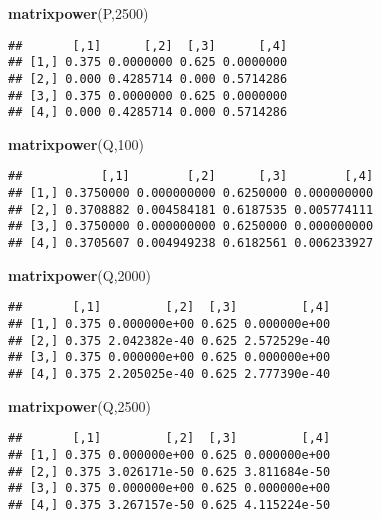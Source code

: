\documentclass[
]{article}
\newenvironment{Shaded}{\begin{snugshade}}{\end{snugshade}}
\newcommand{\DecValTok}[1]{\textcolor[rgb]{0.00,0.00,0.81}{#1}}
\newcommand{\FunctionTok}[1]{\textcolor[rgb]{0.13,0.29,0.53}{\textbf{#1}}}
\newcommand{\NormalTok}[1]{#1}
\begin{document}
\begin{Shaded}
\begin{Highlighting}[]
\FunctionTok{matrixpower}\NormalTok{(P,}\DecValTok{2500}\NormalTok{)}
\end{Highlighting}
\end{Shaded}

\begin{verbatim}
##       [,1]      [,2]  [,3]      [,4]
## [1,] 0.375 0.0000000 0.625 0.0000000
## [2,] 0.000 0.4285714 0.000 0.5714286
## [3,] 0.375 0.0000000 0.625 0.0000000
## [4,] 0.000 0.4285714 0.000 0.5714286
\end{verbatim}

\begin{Shaded}
\begin{Highlighting}[]
\FunctionTok{matrixpower}\NormalTok{(Q,}\DecValTok{100}\NormalTok{)}
\end{Highlighting}
\end{Shaded}

\begin{verbatim}
##           [,1]        [,2]      [,3]        [,4]
## [1,] 0.3750000 0.000000000 0.6250000 0.000000000
## [2,] 0.3708882 0.004584181 0.6187535 0.005774111
## [3,] 0.3750000 0.000000000 0.6250000 0.000000000
## [4,] 0.3705607 0.004949238 0.6182561 0.006233927
\end{verbatim}

\begin{Shaded}
\begin{Highlighting}[]
\FunctionTok{matrixpower}\NormalTok{(Q,}\DecValTok{2000}\NormalTok{)}
\end{Highlighting}
\end{Shaded}

\begin{verbatim}
##       [,1]         [,2]  [,3]         [,4]
## [1,] 0.375 0.000000e+00 0.625 0.000000e+00
## [2,] 0.375 2.042382e-40 0.625 2.572529e-40
## [3,] 0.375 0.000000e+00 0.625 0.000000e+00
## [4,] 0.375 2.205025e-40 0.625 2.777390e-40
\end{verbatim}

\begin{Shaded}
\begin{Highlighting}[]
\FunctionTok{matrixpower}\NormalTok{(Q,}\DecValTok{2500}\NormalTok{)}
\end{Highlighting}
\end{Shaded}

\begin{verbatim}
##       [,1]         [,2]  [,3]         [,4]
## [1,] 0.375 0.000000e+00 0.625 0.000000e+00
## [2,] 0.375 3.026171e-50 0.625 3.811684e-50
## [3,] 0.375 0.000000e+00 0.625 0.000000e+00
## [4,] 0.375 3.267157e-50 0.625 4.115224e-50
\end{verbatim}
\end{document}
